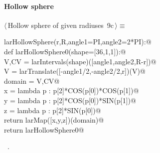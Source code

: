 \documentclass[11pt,oneside]{article}	%
\begin{document}
\paragraph{Hollow sphere}
\begin{flushleft} \small \label{scrap19}
\protect{}$\langle\,$Hollow sphere of given radiuses\nobreak\ {\footnotesize 9c}$\,\rangle\equiv$
\vspace{-1ex}
\begin{list}{}{} \item
\mbox{}\verb@def larHollowSphere(r,R,angle1=PI,angle2=2*PI):@\\
\mbox{}\verb@   def larHollowSphere0(shape=[36,1,1]):@\\
\mbox{}\verb@      V,CV = larIntervals(shape)([angle1,angle2,R-r])@\\
\mbox{}\verb@      V = larTranslate([-angle1/2,-angle2/2,r])(V)@\\
\mbox{}\verb@      domain = V,CV@\\
\mbox{}\verb@      x = lambda p : p[2]*COS(p[0])*COS(p[1])@\\
\mbox{}\verb@      y = lambda p : p[2]*COS(p[0])*SIN(p[1])@\\
\mbox{}\verb@      z = lambda p : p[2]*SIN(p[0])@\\
\mbox{}\verb@      return larMap([x,y,z])(domain)@\\
\mbox{}\verb@   return larHollowSphere0@\\
\mbox{}\verb@@{\NWsep}
\end{list}
\vspace{-1ex}
\footnotesize\addtolength{\baselineskip}{-1ex}
\begin{list}{}{\setlength{\itemsep}{-\parsep}\setlength{\itemindent}{-\leftmargin}}
\item \NWtxtMacroRefIn\ .
\end{list}
\end{flushleft}
\end{document}
